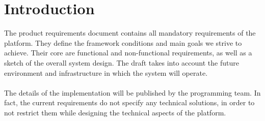 \chapter{Introduction}
The product requirements document contains all mandatory requirements of the platform. They define the framework conditions and main goals we strive to achieve. Their core are functional and non-functional requirements, as well as a sketch of the overall system design. The draft takes into account the future environment and infrastructure in which the system will operate. 
\\\\
The details of the implementation will be published by the programming team. In fact, the current requirements do not specify any technical solutions, in order to not restrict them while designing the technical aspects of the platform.